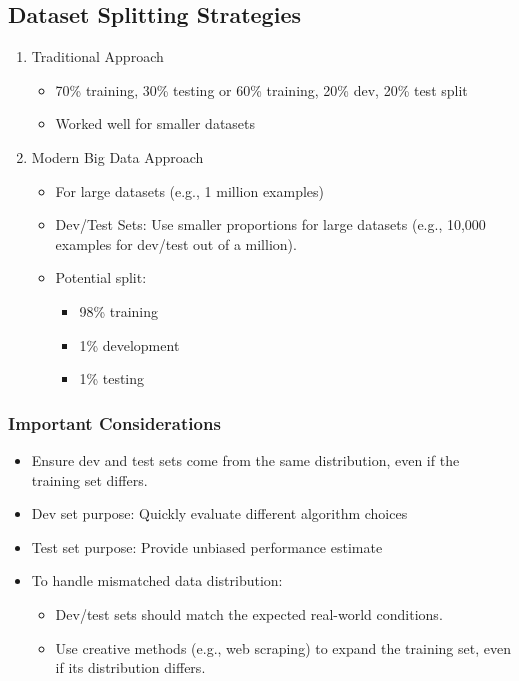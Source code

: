\documentclass[letterpaper,12pt,notitlepage,twoside]{report}
\begin{document}
\subsection*{Dataset Splitting Strategies}
\begin{enumerate}[leftmargin=*,  nosep]
    \item Traditional Approach
    \begin{itemize}[nosep]
        \item 70\% training, 30\% testing or 60\% training, 20\% dev, 20\% test split 
        \item Worked well for smaller datasets
    \end{itemize}
    
    \item Modern Big Data Approach
    \begin{itemize}[leftmargin=*,  nosep]
        \item For large datasets (e.g., 1 million examples)
        \item Dev/Test Sets: Use smaller proportions for large datasets (e.g., 10,000 examples for dev/test out of a million).
        \item Potential split: 
        \begin{itemize}[nosep]
            \item 98\% training
            \item 1\% development
            \item 1\% testing
        \end{itemize}
    \end{itemize}
\end{enumerate}

\subsubsection{Important Considerations}
\begin{itemize}[leftmargin=*,  nosep]
    \item Ensure dev and test sets come from the same distribution, even if the training set differs.
    \item Dev set purpose: Quickly evaluate different algorithm choices
    \item Test set purpose: Provide unbiased performance estimate
    \item To handle mismatched data distribution:
        \begin{itemize}[nosep]
            \item Dev/test sets should match the expected real-world conditions.
            \item Use creative methods (e.g., web scraping) to expand the training set, even if its distribution differs.
        \end{itemize}
\end{itemize}
\end{document}
